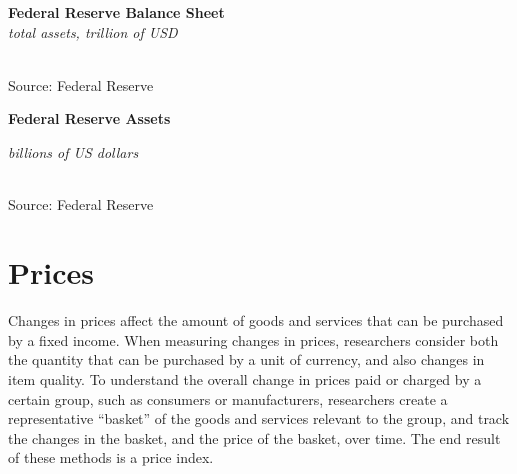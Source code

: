 \documentclass{report}
\makeatletter
\newcommand{\tbllink}[1]{\href{https://raw.githubusercontent.com/bdecon/US-chartbook/master/chartbook/data/#1}{\faTable}}
\newcommand*\short[1]{\expandafter\@gobbletwo\number\numexpr#1\relax}
\newcommand{\dateaxisticks}{
		date coordinates in=x, axis line style={draw=none},
		xmax={2022-10-31},
		max space between ticks=40,	    
		xtick={{1990-01-01}, {1992-01-01}, {1994-01-01}, 
			{1996-01-01}, {1998-01-01}, {2000-01-01}, 
			{2002-01-01}, {2004-01-01}, {2006-01-01},
			{2008-01-01}, {2010-01-01}, {2012-01-01}, {2014-01-01},
		    {2016-01-01}, {2018-01-01}, {2020-01-01}, {2022-01-01}, 
		    {2024-01-01}, {2026-01-01}},
		minor xtick={{1989-01-01}, {1991-01-01}, {1993-01-01},
			{1995-01-01}, {1997-01-01}, {1999-01-01}, 
			{2001-01-01}, {2003-01-01}, {2005-01-01}, {2007-01-01},
		    {2009-01-01}, {2011-01-01}, {2013-01-01}, {2015-01-01},
		    {2017-01-01}, {2019-01-01}, {2021-01-01}, {2023-01-01}, 
		    {2025-01-01}, {2027-01-01}},
		enlarge y limits={0.06}, enlarge x limits={0.01},
		}
\newcommand{\bbar}[2]{extra #1 ticks = {{#2}}, extra #1 tick labels = ,
		extra #1 tick style = {grid=major, grid style={thick, black!25}},}
\newcommand{\stdline}[4]{\addplot[very thick, no markers, color=#1] 
		table [x=#2, y=#3, col sep=comma] {#4};	}
\newcommand{\recbars}{
		\fill[color=black!10] (axis cs:{2007-12-01},\pgfkeysvalueof{/pgfplots/ymin}) rectangle 
			(axis cs:{2009-07-01}, \pgfkeysvalueof{/pgfplots/ymax});
		\fill[color=black!10] (axis cs:{2020-02-01},\pgfkeysvalueof{/pgfplots/ymin}) rectangle 
			(axis cs:{2020-05-01}, \pgfkeysvalueof{/pgfplots/ymax});}
\makeatother
\begin{document}
{\begin{minipage}{0.44\textwidth}
\normalsize \textbf{Federal Reserve Balance Sheet}\\
\footnotesize{\textit{total assets, trillion of USD}}\\
\hspace*{-2mm} \\
\footnotesize{Source: Federal Reserve} \hfill \tbllink{fed_assets.csv}
\end{minipage}\hspace{7mm}
\begin{minipage}{0.27\textwidth}
\small 
\end{minipage}
\vspace{8mm}

\begin{minipage}{0.76\textwidth}
\normalsize \textbf{Federal Reserve Assets}\\
\footnotesize{\textit{billions of US dollars}\\
 \setlength{\tabcolsep}{3.1pt} \color{black!90}
{\renewcommand{\arraystretch}{1.54}
	\begin{tabular}{p{40mm} R{13.0mm} R{13.0mm} R{13.0mm} R{13.0mm} R{13.0mm}}
		 \hline
	\end{tabular}
}}
		
\vspace{-2mm}
\footnotesize{Source: Federal Reserve}
\end{minipage}
\newpage
\hypertarget{pr}{}
\section*{Prices}
\begin{minipage}{0.76\textwidth}
\small Changes in prices affect the amount of goods and services that can be purchased by a fixed income. When measuring changes in prices, researchers consider both the quantity that can be purchased by a unit of currency, and also changes in item quality. To understand the overall change in prices paid or charged by a certain group, such as consumers or manufacturers, researchers create a representative ``basket'' of the goods and services relevant to the group, and track the changes in the basket, and the price of the basket, over time. The end result of these methods is a price index.


\end{minipage}}
\end{document}
